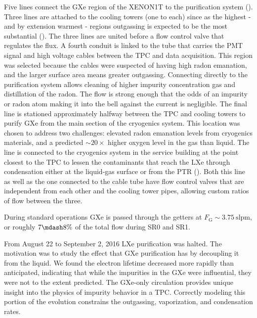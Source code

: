 Five lines connect the GXe region of the XENON1T to the purification system ().  Three lines are attached to
the cooling towers (one to each) since as the highest - and by extension warmest - regions outgassing is expected to be the most
substantial ().  The three lines are united before a flow control valve
that regulates the flux.  A fourth conduit is linked to the tube that carries the PMT signal and high voltage cables between the TPC and
data acquisition.  This region was selected because the cables were suspected of having high radon emanation, and the larger surface area
means greater outgassing.  Connecting directly to the purification system allows cleaning of higher impurity concentration gas and
distillation of the radon.  The flow is strong enough that the odds of an impurity or radon atom making it into the bell against the
current is negligible.  The final line is stationed
approximately halfway between the TPC and cooling towers to purify GXe from the main section of the cryogenics system.  This location was
chosen to address two challenges: elevated radon emanation levels from cryogenics materials, and a predicted ${\sim}20\times$ higher
oxygen level in the gas than liquid.  The line is connected to the cryogenics system in the service building at the point closest to the
TPC to lessen the contaminants that reach the LXe through condensation either at the liquid-gas surface or from the PTR
().  Both this line as well
as the one connected to the cable tube have flow control valves that are independent from each other and the cooling tower pipes, allowing
custom ratios of flow between the three.

During standard operations GXe is passed through the getters at $F_{\mathrm{G}} {\sim} 3.75\ \mathrm{slpm}$, or roughly $7 \mdash 8\%$ of
the total flow during SR0 and SR1.

From August 22 to September 2, 2016 LXe purification was halted.  The motivation was to study the effect that GXe purification has by
decoupling it from the liquid.  We found the electron lifetime decreased more rapidly than anticipated, indicating that while the
impurities in the GXe were influential, they were not to the extent predicted.  The GXe-only circulation provides unique insight into
the physics of impurity behavior in a TPC.  Correctly modeling this portion of the evolution constrains the outgassing, vaporization,
and condensation rates.



